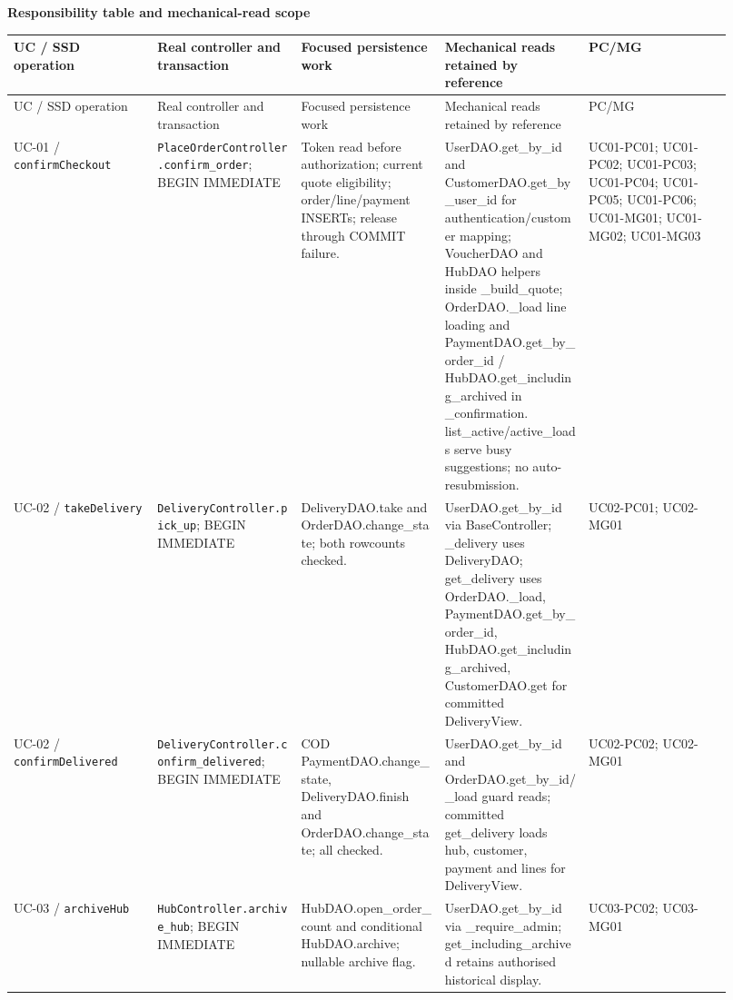 \textbf{Responsibility table and mechanical-read scope}

\begin{longtable}{>{\raggedright\arraybackslash}p{0.1840\linewidth}>{\raggedright\arraybackslash}p{0.1840\linewidth}>{\raggedright\arraybackslash}p{0.1840\linewidth}>{\raggedright\arraybackslash}p{0.1840\linewidth}>{\raggedright\arraybackslash}p{0.1840\linewidth}}
UC / SSD operation & Real controller and transaction & Focused persistence work & Mechanical reads retained by reference & PC/MG \\
\hline\endfirsthead
UC / SSD operation & Real controller and transaction & Focused persistence work & Mechanical reads retained by reference & PC/MG \\
\hline\endhead
UC-01 / \texttt{confirmCheckout} & \texttt{PlaceOrderController.\allowbreak{}confirm\_\allowbreak{}order}; BEGIN IMMEDIATE & Token read before authorization; current quote eligibility; order/line/payment INSERTs; release through COMMIT failure. & UserDAO.get\_by\_id and CustomerDAO.get\_by\_user\_id for authentication/customer mapping; VoucherDAO and HubDAO helpers inside \_build\_quote; OrderDAO.\_load line loading and PaymentDAO.get\_by\_order\_id / HubDAO.get\_including\_archived in \_confirmation. list\_active/active\_loads serve busy suggestions; no auto-resubmission. & UC01-PC01; UC01-PC02; UC01-PC03; UC01-PC04; UC01-PC05; UC01-PC06; UC01-MG01; UC01-MG02; UC01-MG03 \\
UC-02 / \texttt{takeDelivery} & \texttt{DeliveryController.\allowbreak{}pick\_\allowbreak{}up}; BEGIN IMMEDIATE & DeliveryDAO.take and OrderDAO.change\_state; both rowcounts checked. & UserDAO.get\_by\_id via BaseController; \_delivery uses DeliveryDAO; get\_delivery uses OrderDAO.\_load, PaymentDAO.get\_by\_order\_id, HubDAO.get\_including\_archived, CustomerDAO.get for committed DeliveryView. & UC02-PC01; UC02-MG01 \\
UC-02 / \texttt{confirmDelivered} & \texttt{DeliveryController.\allowbreak{}confirm\_\allowbreak{}delivered}; BEGIN IMMEDIATE & COD PaymentDAO.change\_state, DeliveryDAO.finish and OrderDAO.change\_state; all checked. & UserDAO.get\_by\_id and OrderDAO.get\_by\_id/\_load guard reads; committed get\_delivery loads hub, customer, payment and lines for DeliveryView. & UC02-PC02; UC02-MG01 \\
UC-03 / \texttt{archiveHub} & \texttt{HubController.\allowbreak{}archive\_\allowbreak{}hub}; BEGIN IMMEDIATE & HubDAO.open\_order\_count and conditional HubDAO.archive; nullable archive flag. & UserDAO.get\_by\_id via \_require\_admin; get\_including\_archived retains authorised historical display. & UC03-PC02; UC03-MG01 \\

\end{longtable}

